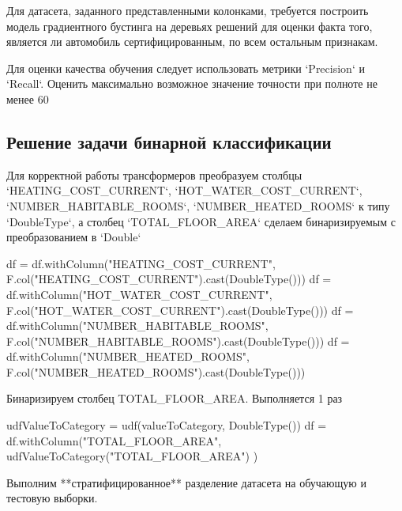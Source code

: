 Для датасета, заданного представленными колонками, требуется построить модель градиентного бустинга на деревьях решений для оценки факта того, является ли автомобиль сертифицированным, по всем остальным признакам. 

Для оценки качества обучения следует использовать метрики `Precision` и `Recall`. Оценить максимально возможное значение точности при полноте не менее 60%

\vspace{\baselineskip}\subsection{Решение задачи бинарной классификации}\vspace{\baselineskip}

\p Для корректной работы трансформеров преобразуем столбцы `HEATING\_COST\_CURRENT`, `HOT\_WATER\_COST\_CURRENT`, `NUMBER\_HABITABLE\_ROOMS`, `NUMBER\_HEATED\_ROOMS` к типу `DoubleType`, а столбец `TOTAL\_FLOOR\_AREA` сделаем бинаризируемым с преобразованием в `Double`

\begin{code}
df = df.withColumn("HEATING_COST_CURRENT", F.col("HEATING_COST_CURRENT").cast(DoubleType()))\n
df = df.withColumn("HOT_WATER_COST_CURRENT", F.col("HOT_WATER_COST_CURRENT").cast(DoubleType()))\n
df = df.withColumn("NUMBER_HABITABLE_ROOMS", F.col("NUMBER_HABITABLE_ROOMS").cast(DoubleType()))\n
df = df.withColumn("NUMBER_HEATED_ROOMS", F.col("NUMBER_HEATED_ROOMS").cast(DoubleType()))\n
\end{code}

\p Бинаризируем столбец TOTAL\_FLOOR\_AREA. Выполняется 1 раз

\begin{code}
udfValueToCategory = udf(valueToCategory, DoubleType())
df = df.withColumn("TOTAL_FLOOR_AREA", udfValueToCategory("TOTAL_FLOOR_AREA") )
\end{code}

\p Выполним **стратифицированное** разделение датасета на обучающую и тестовую выборки.

